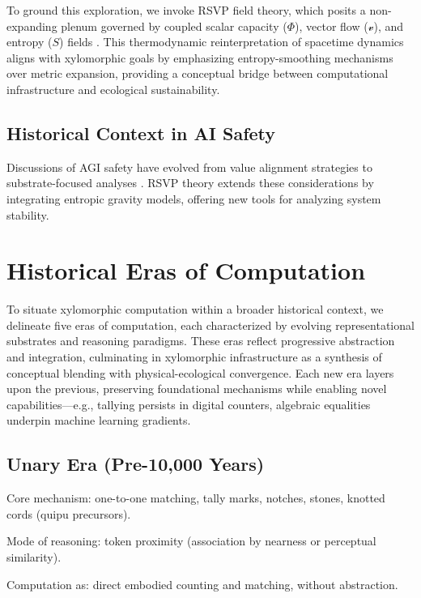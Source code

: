 \documentclass[12pt]{article}
\begin{document}
To ground this exploration, we invoke RSVP field theory, which posits a non-expanding plenum governed by coupled scalar capacity ($\Phi$), vector flow ($\mathcal{v}$), and entropy ($S$) fields \citep{Jacobson1995,Padmanabhan2010,Verlinde2011}. This thermodynamic reinterpretation of spacetime dynamics aligns with xylomorphic goals by emphasizing entropy-smoothing mechanisms over metric expansion, providing a conceptual bridge between computational infrastructure and ecological sustainability.

\subsection{Historical Context in AI Safety}

Discussions of AGI safety have evolved from value alignment strategies \citep{Yudkowsky2004} to substrate-focused analyses \citep{Petillo2024,Yampolskiy2020}. RSVP theory extends these considerations by integrating entropic gravity models, offering new tools for analyzing system stability.

\section{Historical Eras of Computation}

To situate xylomorphic computation within a broader historical context, we delineate five eras of computation, each characterized by evolving representational substrates and reasoning paradigms. These eras reflect progressive abstraction and integration, culminating in xylomorphic infrastructure as a synthesis of conceptual blending with physical-ecological convergence. Each new era layers upon the previous, preserving foundational mechanisms while enabling novel capabilities—e.g., tallying persists in digital counters, algebraic equalities underpin machine learning gradients.

\subsection{Unary Era (Pre-10,000 Years)}

Core mechanism: one-to-one matching, tally marks, notches, stones, knotted cords (quipu precursors).

Mode of reasoning: token proximity (association by nearness or perceptual similarity).

Computation as: direct embodied counting and matching, without abstraction.
\end{document}
